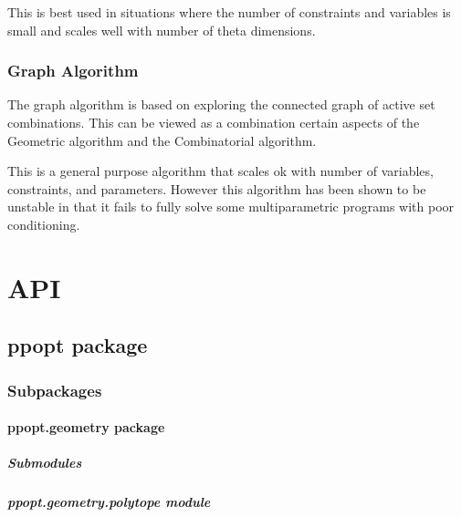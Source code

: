 \documentclass[letterpaper,10pt,english]{sphinxmanual}
\begin{document}
\sphinxAtStartPar
This is best used in situations where the number of constraints and variables is small and scales well with number of theta dimensions.


\subsection{Graph Algorithm}
\label{\detokenize{algorithm_overview:graph-algorithm}}
\sphinxAtStartPar
The graph algorithm is based on exploring the connected graph of active set combinations. This can be viewed as a combination certain aspects of the Geometric algorithm and the Combinatorial algorithm.

\sphinxAtStartPar
This is a general purpose algorithm that scales ok with number of variables, constraints, and parameters. However this algorithm has been shown to be unstable in that it fails to fully solve some multiparametric programs with poor conditioning.


\chapter{API}
\label{\detokenize{index:api}}

\section{ppopt package}
\label{\detokenize{ppopt:ppopt-package}}\label{\detokenize{ppopt::doc}}

\subsection{Subpackages}
\label{\detokenize{ppopt:subpackages}}

\subsubsection{ppopt.geometry package}
\label{\detokenize{ppopt.geometry:ppopt-geometry-package}}\label{\detokenize{ppopt.geometry::doc}}

\paragraph{Submodules}
\label{\detokenize{ppopt.geometry:submodules}}

\paragraph{ppopt.geometry.polytope module}
\label{\detokenize{ppopt.geometry:module-ppopt.geometry.polytope}}\label{\detokenize{ppopt.geometry:ppopt-geometry-polytope-module}}
\end{document}
